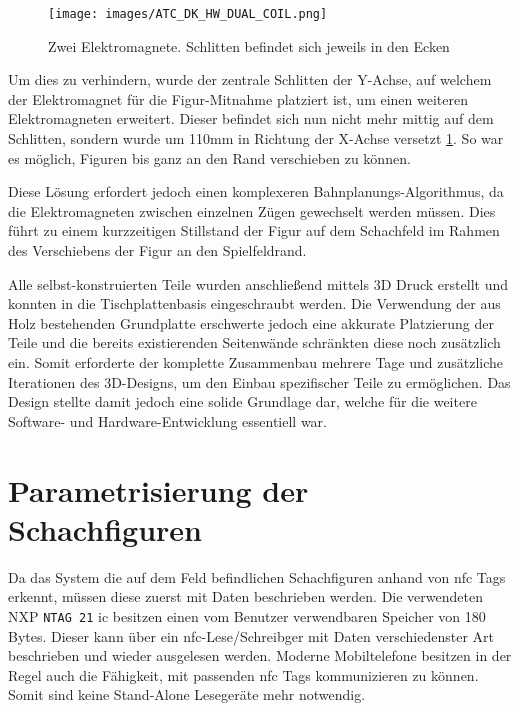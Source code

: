 \begin{figure}
\centering
\texttt{[image: images/ATC\_DK\_HW\_DUAL\_COIL.png]}
\caption{Zwei Elektromagnete. Schlitten befindet sich jeweils in den
Ecken \label{ATC_DK_HW_DUAL_COIL}}
\end{figure}

Um dies zu verhindern, wurde der zentrale Schlitten der Y-Achse, auf
welchem der Elektromagnet für die Figur-Mitnahme platziert ist, um einen
weiteren Elektromagneten erweitert. Dieser befindet sich nun nicht mehr
mittig auf dem Schlitten, sondern wurde um 110mm in Richtung der X-Achse
versetzt \ref{ATC_DK_HW_DUAL_COIL}. So war es möglich, Figuren bis ganz
an den Rand verschieben zu können.

Diese Lösung erfordert jedoch einen komplexeren
Bahnplanungs-Algorithmus, da die Elektromagneten zwischen einzelnen
Zügen gewechselt werden müssen. Dies führt zu einem kurzzeitigen
Stillstand der Figur auf dem Schachfeld im Rahmen des Verschiebens der
Figur an den Spielfeldrand.

Alle selbst-konstruierten Teile wurden anschließend mittels 3D Druck
erstellt und konnten in die Tischplattenbasis eingeschraubt werden. Die
Verwendung der aus Holz bestehenden Grundplatte erschwerte jedoch eine
akkurate Platzierung der Teile und die bereits existierenden Seitenwände
schränkten diese noch zusätzlich ein. Somit erforderte der komplette
Zusammenbau mehrere Tage und zusätzliche Iterationen des 3D-Designs, um
den Einbau spezifischer Teile zu ermöglichen. Das Design stellte damit
jedoch eine solide Grundlage dar, welche für die weitere Software- und
Hardware-Entwicklung essentiell war.

\hypertarget{parametrisierung-der-schachfiguren}{%
\section{Parametrisierung der
Schachfiguren}\label{parametrisierung-der-schachfiguren}}

Da das System die auf dem Feld befindlichen Schachfiguren anhand von
\gls{nfc} Tags erkennt, müssen diese zuerst mit Daten beschrieben
werden. Die verwendeten NXP
\passthrough{\lstinline!NTAG 21!}\cite{nxpntag21} \gls{ic} besitzen
einen vom Benutzer verwendbaren Speicher von 180 Bytes. Dieser kann über
ein \gls{nfc}-Lese/Schreibger mit Daten verschiedenster Art beschrieben
und wieder ausgelesen werden. Moderne Mobiltelefone besitzen in der
Regel auch die Fähigkeit, mit passenden \gls{nfc} Tags kommunizieren zu
können. Somit sind keine Stand-Alone Lesegeräte mehr notwendig.

